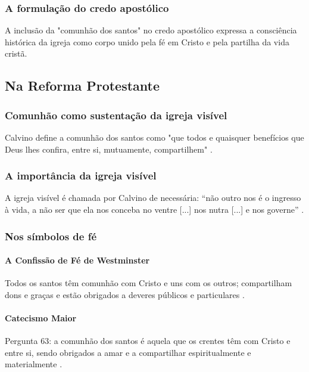 \subsubsection{A formulação do credo apostólico}
A inclusão da "comunhão dos santos" no credo apostólico expressa a consciência histórica da igreja como corpo unido pela fé em Cristo e pela partilha da vida cristã.

\subsection{Na Reforma Protestante}

\subsubsection{Comunhão como sustentação da igreja visível}
Calvino define a comunhão dos santos como "que todos e quaisquer benefícios que Deus lhes confira, entre si, mutuamente, compartilhem" \cite{calvino2022}.

\subsubsection{A importância da igreja visível}
A igreja visível é chamada por Calvino de necessária: “não outro nos é o ingresso à vida, a não ser que ela nos conceba no ventre [...] nos nutra [...] e nos governe” \cite{calvino2022}.

\subsubsection{Nos símbolos de fé}

\paragraph{A Confissão de Fé de Westminster} 
Todos os santos têm comunhão com Cristo e uns com os outros; compartilham dons e graças e estão obrigados a deveres públicos e particulares \cite{cfw}.

\paragraph{Catecismo Maior} 
Pergunta 63: a comunhão dos santos é aquela que os crentes têm com Cristo e entre si, sendo obrigados a amar e a compartilhar espiritualmente e materialmente \cite{catecismoMaior}.

